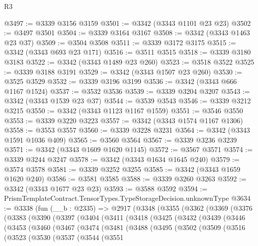 \begin{lexlean}{R3}
\begin{coremodule}
@3497 := @3339 @3156 @3159
@3501 := @3342 (@3343 @1101 @23 @23)
@3502 := @3497 @3501
@3504 := @3339 @3164 @3167
@3508 := @3342 (@3343 @1463 @23 @37)
@3509 := @3504 @3508
@3511 := @3339 @3172 @3175
@3515 := @3342 (@3343 @693 @23 @171)
@3516 := @3511 @3515
@3518 := @3339 @3180 @3183
@3522 := @3342 (@3343 @1489 @23 @260)
@3523 := @3518 @3522
@3525 := @3339 @3188 @3191
@3529 := @3342 (@3343 @1507 @23 @260)
@3530 := @3525 @3529
@3532 := @3339 @3196 @3199
@3536 := @3342 (@3343 @666 @1167 @1524)
@3537 := @3532 @3536
@3539 := @3339 @3204 @3207
@3543 := @3342 (@3343 @1539 @23 @37)
@3544 := @3539 @3543
@3546 := @3339 @3212 @3215
@3550 := @3342 (@3343 @1123 @1167 @1559)
@3551 := @3546 @3550
@3553 := @3339 @3220 @3223
@3557 := @3342 (@3343 @1574 @1167 @1306)
@3558 := @3553 @3557
@3560 := @3339 @3228 @3231
@3564 := @3342 (@3343 @1591 @1036 @409)
@3565 := @3560 @3564
@3567 := @3339 @3236 @3239
@3571 := @3342 (@3343 @1609 @1620 @1145)
@3572 := @3567 @3571
@3574 := @3339 @3244 @3247
@3578 := @3342 (@3343 @1634 @1645 @240)
@3579 := @3574 @3578
@3581 := @3339 @3252 @3255
@3585 := @3342 (@3343 @1659 @1620 @240)
@3586 := @3581 @3585
@3588 := @3339 @3260 @3263
@3592 := @3342 (@3343 @1677 @23 @23)
@3593 := @3588 @3592
@3594 := PrismTemplateContract.TensorTypes.TypeStorageDecision.unknownType
@3634 := @3338
    (fun (__b : @2335) =>
    @2917
      (@3348
        (@3355
          (@3362
            (@3369
              (@3376
                (@3383
                  (@3390
                    (@3397
                      (@3404
                        (@3411
                          (@3418
                            (@3425
                              (@3432
                                (@3439
                                  (@3446
                                    (@3453
                                      (@3460
                                        (@3467
                                          (@3474
                                            (@3481
                                              (@3488
                                                (@3495
                                                  (@3502
                                                    (@3509
                                                      (@3516
                                                        (@3523
                                                          (@3530
                                                            (@3537
                                                              (@3544
                                                                (@3551

\end{coremodule}
\end{lexlean}
